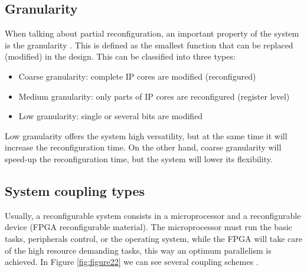 \documentclass[twoside]{romjist}
\begin{document}
	\subsection{Granularity}
	\hspace{0.5cm}
	When talking about partial reconfiguration, an important property of the system is the
	granularity \cite{1}. This is defined as the smallest function that can be replaced (modified) in the
	design. This can be classified into three types:
	\begin{itemize}
		\item
		Coarse granularity: complete IP cores are modified (reconfigured)
		\item
		Medium granularity: only parts of IP cores are reconfigured (register level)
		\item
		Low granularity: single or several bits are modified
	\end{itemize}
	\hspace{0.5cm}
	Low granularity offers the system high versatility, but at the same time it will increase the
	reconfiguration time. On the other hand, coarse granularity will speed-up the reconfiguration
	time, but the system will lower its flexibility.
	
	\subsection{System coupling types}
	\hspace{0.5cm}
	Usually, a reconfigurable system consists in a microprocessor and a reconfigurable device
	(FPGA reconfigurable material). The microprocessor must run the basic tasks, peripherals
	control, or the operating system, while the FPGA will take care of the high resource demanding
	tasks, this way an optimum parallelism is achieved. In Figure \ref{fig:figure22} we can see several coupling
	schemes \cite{3}.
	
\end{document}
